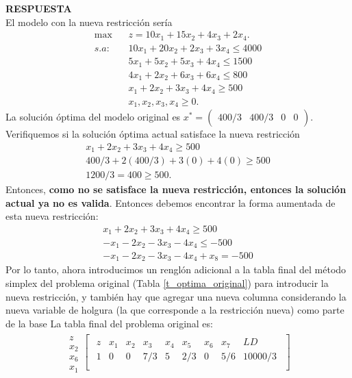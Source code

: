 \documentclass[11pt,letterpaper]{article}
\newcommand{\res}{\textbf{RESPUESTA}\\}
\begin{document}
\begin{enumerate}
\res El modelo con la nueva restricción sería 
\begin{align*}
\max\ \ \ \ & z=10x_1+15x_2+4x_3+2x_4.\\
s.a:\ \ \ \ & 10x_1+20x_2 +2x_3+3x_4\leq 4000\\
	 & 5x_1+5x_2+5x_3+4x_4\leq 1500\\
	 & 4x_1+2x_2+6x_3+6x_4 \leq 800\\
	 & x_1+ 2x_2+3x_3+4x_4 \geq 500\\
	 & x_1,x_2,x_3,x_4 \geq 0. 
\end{align*}
La solución óptima del modelo original es $x^*=\begin{pmatrix}
400/3 & 400/3 & 0 & 0
\end{pmatrix}.$ Verifiquemos si la solución óptima actual satisface la nueva restricción
\begin{align*}
x_1+ 2x_2+3x_3+4x_4 \geq 500\\
400/3+2(400/3)+3(0)+4(0)\geq 500\\
1200/3=400 \geq 500.
\end{align*}
Entonces, \textbf{como no se satisface la nueva restricción, entonces la solución actual ya no es valida}. Entonces debemos encontrar la forma aumentada de esta nueva restricción:
\begin{align*}
x_1+ 2x_2+3x_3+4x_4 \geq 500\\
-x_1- 2x_2-3x_3-4x_4 \leq-500\\
-x_1- 2x_2-3x_3-4x_4+x_8 =-500
\end{align*}
Por lo tanto, ahora introducimos un renglón adicional a la tabla final del método simplex del problema original (Tabla \ref{t_optima_original}) para introducir la nueva restricción, y también hay que agregar una nueva columna considerando la nueva variable de holgura (la que corresponde a la restricción nueva) como parte de la base La tabla final del problema original es:
\begin{equation} 
\begin{array}{c}
\\
z \\ 
x_2 \\
x_6 \\
x_1
\end{array}
\begin{bmatrix}
\begin{array}{c||cccccccc}
  z & x_1 & x_2 & x_3 & x_4 & x_5 & x_6 & x_7 & LD\\ \hline \hline
  1 & 0 & 0 & 7/3 & 5 & 2/3 & 0 & 5/6 & 10000/3\\ 

\end{array}
\end{bmatrix}
\end{equation}
\end{enumerate}
\end{document}
